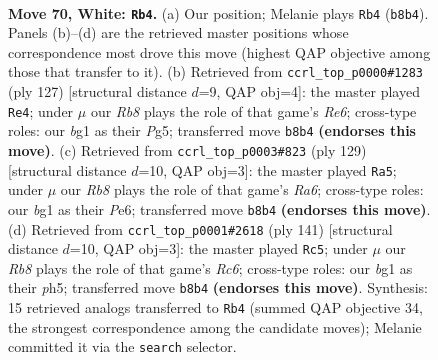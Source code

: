 \documentclass[11pt]{article}
\begin{document}
\clearpage

\begin{figure}[p]\centering
\begin{subfigure}{0.46\textwidth}\centering
\resizebox{\linewidth}{!}{%
\newchessgame
\chessboard[
  setfen={1R6/7k/3Nn3/P7/8/7r/2K5/6b1 w - - 7 70},
  showmover=false,
  pgfstyle=straightmove, color=movearrow, markmove={b8-b4}
]}
\caption{}
\end{subfigure}\hfill
\begin{subfigure}{0.46\textwidth}\centering
\resizebox{\linewidth}{!}{%
\newchessgame
\chessboard[
  setfen={8/5k2/7R/6p1/6P1/4r3/7K/8 b - - 0 64},
  showmover=false,
  pgfstyle=straightmove, color=movearrow, markmove={e3-e4}
]}
\caption{}
\end{subfigure}
\\[4pt]
\begin{subfigure}{0.46\textwidth}\centering
\resizebox{\linewidth}{!}{%
\newchessgame
\chessboard[
  setfen={8/5R2/4p3/4P1k1/8/r7/5K2/8 b - - 4 65},
  showmover=false,
  pgfstyle=straightmove, color=movearrow, markmove={a3-a5}
]}
\caption{}
\end{subfigure}\hfill
\begin{subfigure}{0.46\textwidth}\centering
\resizebox{\linewidth}{!}{%
\newchessgame
\chessboard[
  setfen={8/2k3p1/6N1/6nP/1R6/2r5/8/1K6 b - - 0 71},
  showmover=false,
  pgfstyle=straightmove, color=movearrow, markmove={c3-c5}
]}
\caption{}
\end{subfigure}
\caption{\textbf{Move 70, White: \texttt{Rb4}.} (a) Our position; Melanie plays \texttt{Rb4} (\texttt{b8b4}). Panels (b)--(d) are the retrieved master positions whose correspondence most drove this move (highest QAP objective among those that transfer to it). (b) Retrieved from \texttt{ccrl\_top\_p0000\#1283} (ply 127) [structural distance $d$=9, QAP obj=4]: the master played \texttt{Re4}; under $\mu$ our \emph{Rb8} plays the role of that game's \emph{Re6}; cross-type roles: our \emph{b}g1 as their \emph{P}g5; transferred move \texttt{b8b4} \textbf{(endorses this move)}. (c) Retrieved from \texttt{ccrl\_top\_p0003\#823} (ply 129) [structural distance $d$=10, QAP obj=3]: the master played \texttt{Ra5}; under $\mu$ our \emph{Rb8} plays the role of that game's \emph{Ra6}; cross-type roles: our \emph{b}g1 as their \emph{P}e6; transferred move \texttt{b8b4} \textbf{(endorses this move)}. (d) Retrieved from \texttt{ccrl\_top\_p0001\#2618} (ply 141) [structural distance $d$=10, QAP obj=3]: the master played \texttt{Rc5}; under $\mu$ our \emph{Rb8} plays the role of that game's \emph{Rc6}; cross-type roles: our \emph{b}g1 as their \emph{p}h5; transferred move \texttt{b8b4} \textbf{(endorses this move)}. Synthesis: 15 retrieved analogs transferred to \texttt{Rb4} (summed QAP objective 34, the strongest correspondence among the candidate moves); Melanie committed it via the \texttt{search} selector.}
\label{fig:thought-m138}
\end{figure}
\end{document}
